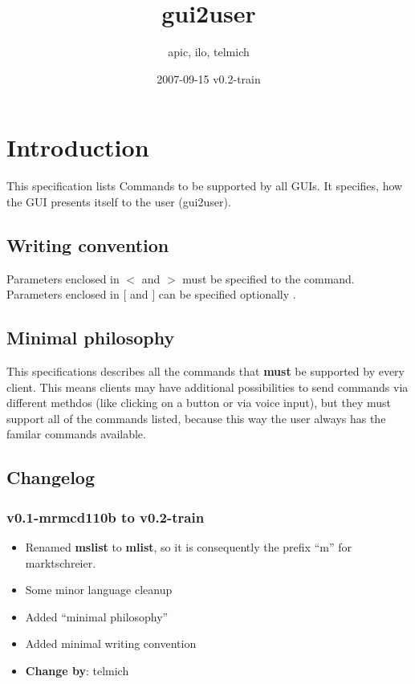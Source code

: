\documentclass[12pt,a4paper]{article}
\begin{document}
\title{gui2user}
\date{2007-09-15 v0.2-train}
\author{apic, ilo, telmich}

\maketitle

\section{Introduction}
This specification lists Commands to be supported by all GUIs. It
specifies, how the GUI presents itself to the user (gui2user).

\subsection{Writing convention}
Parameters enclosed in $<$ and $>$ must be specified to the command.
Parameters enclosed in $[$ and $]$ can be specified optionally .

\subsection{Minimal philosophy}
This specifications describes all the commands that \textbf{must} be
supported by every client. This means clients may have additional possibilities
to send commands via different methdos (like clicking on a button or via
voice input), but they must support all of the commands listed, because this
way the user always has the familar commands available.

\subsection{Changelog}
\subsubsection{v0.1-mrmcd110b to v0.2-train}
   \begin{itemize}
      \item Renamed \textbf{mslist} to \textbf{mlist}, so it is consequently the prefix
      "`m"' for marktschreier.
      \item Some minor language cleanup 
      \item Added "`minimal philosophy"'
      \item Added minimal writing convention
      \item \textbf{Change by}: telmich
   \end{itemize}
\end{document}
